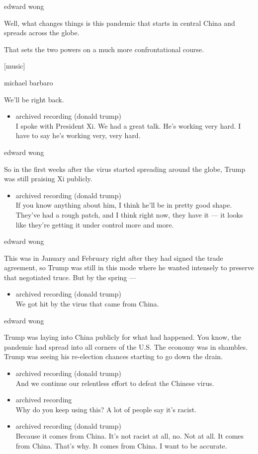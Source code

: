 edward wong

Well, what changes things is this pandemic that starts in central China
and spreads across the globe.

That sets the two powers on a much more confrontational course.

{[}music{]}

michael barbaro

We'll be right back.

\begin{itemize}
\tightlist
\item
  archived recording (donald trump)\\
  I spoke with President Xi. We had a great talk. He's working very
  hard. I have to say he's working very, very hard.
\end{itemize}

edward wong

So in the first weeks after the virus started spreading around the
globe, Trump was still praising Xi publicly.

\begin{itemize}
\tightlist
\item
  archived recording (donald trump)\\
  If you know anything about him, I think he'll be in pretty good shape.
  They've had a rough patch, and I think right now, they have it --- it
  looks like they're getting it under control more and more.
\end{itemize}

edward wong

This was in January and February right after they had signed the trade
agreement, so Trump was still in this mode where he wanted intensely to
preserve that negotiated truce. But by the spring ---

\begin{itemize}
\tightlist
\item
  archived recording (donald trump)\\
  We got hit by the virus that came from China.
\end{itemize}

edward wong

Trump was laying into China publicly for what had happened. You know,
the pandemic had spread into all corners of the U.S. The economy was in
shambles. Trump was seeing his re-election chances starting to go down
the drain.

\begin{itemize}
\item
  archived recording (donald trump)\\
  And we continue our relentless effort to defeat the Chinese virus.
\item
  archived recording\\
  Why do you keep using this? A lot of people say it's racist.
\item
  archived recording (donald trump)\\
  Because it comes from China. It's not racist at all, no. Not at all.
  It comes from China. That's why. It comes from China. I want to be
  accurate.
\end{itemize}

